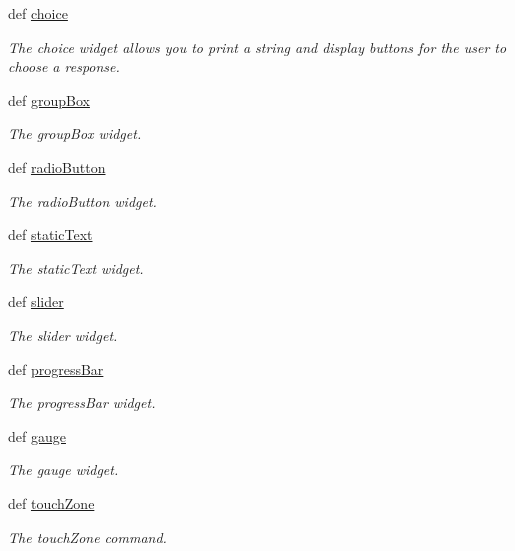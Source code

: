\begin{DoxyCompactItemize}
def \hyperlink{group___widgets_gaae5f45e0ca7c8a0294c75b786d728992}{choice}
\begin{DoxyCompactList}\small\item\em The choice widget allows you to print a string and display buttons for the user to choose a response. \end{DoxyCompactList}\item 
def \hyperlink{group___widgets_ga189db08deeaf2ff69fad7e7e3612fe5b}{group\-Box}
\begin{DoxyCompactList}\small\item\em The group\-Box widget. \end{DoxyCompactList}\item 
def \hyperlink{group___widgets_gaef2c149d7df7f92b718a8660fd0db245}{radio\-Button}
\begin{DoxyCompactList}\small\item\em The radio\-Button widget. \end{DoxyCompactList}\item 
def \hyperlink{group___widgets_gacee37e549f8a877a715b68d39460f7b7}{static\-Text}
\begin{DoxyCompactList}\small\item\em The static\-Text widget. \end{DoxyCompactList}\item 
def \hyperlink{group___widgets_ga93ee96540f5ffc5c4704f60592074d80}{slider}
\begin{DoxyCompactList}\small\item\em The slider widget. \end{DoxyCompactList}\item 
def \hyperlink{group___widgets_ga9eeb62ec0060e5ba57e42986b2d555ae}{progress\-Bar}
\begin{DoxyCompactList}\small\item\em The progress\-Bar widget. \end{DoxyCompactList}\item 
def \hyperlink{group___widgets_gab71489d4d59dfc595166ed91ff97ed3b}{gauge}
\begin{DoxyCompactList}\small\item\em The gauge widget. \end{DoxyCompactList}\item 
def \hyperlink{group___widgets_gaeb901f189e33956b4cd51fbd78bcf957}{touch\-Zone}
\begin{DoxyCompactList}\small\item\em The touch\-Zone command. \end{DoxyCompactList}\item 

\end{DoxyCompactItemize}
